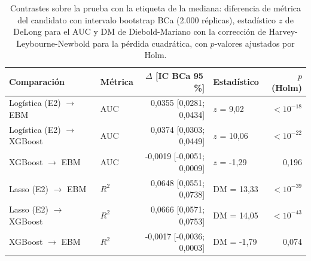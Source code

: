 \begin{table}[htbp]
\caption{Contrastes sobre la prueba con la etiqueta de la mediana: diferencia de métrica del candidato con intervalo bootstrap BCa (2.000 réplicas), estadístico $z$ de DeLong para el AUC y DM de Diebold-Mariano con la corrección de Harvey-Leybourne-Newbold para la pérdida cuadrática, con $p$-valores ajustados por Holm.}\label{tab:contrastes}
\scriptsize\setlength{\tabcolsep}{2pt}
\begin{tabular}{llrlr}
\toprule
\textbf{Comparación} & \textbf{Métrica} & \textbf{$\Delta$ [IC BCa 95\,\%]} & \textbf{Estadístico} & \textbf{$p$ (Holm)} \\
\midrule
Logística (E2) $\rightarrow$ EBM & AUC & 0,0355 [0,0281; 0,0434] & $z$ = 9,02 & $<10^{-18}$ \\
Logística (E2) $\rightarrow$ XGBoost & AUC & 0,0374 [0,0303; 0,0449] & $z$ = 10,06 & $<10^{-22}$ \\
XGBoost $\rightarrow$ EBM & AUC & -0,0019 [-0,0051; 0,0009] & $z$ = -1,29 & 0,196 \\
Lasso (E2) $\rightarrow$ EBM & $R^2$ & 0,0648 [0,0551; 0,0738] & DM = 13,33 & $<10^{-39}$ \\
Lasso (E2) $\rightarrow$ XGBoost & $R^2$ & 0,0666 [0,0571; 0,0753] & DM = 14,05 & $<10^{-43}$ \\
XGBoost $\rightarrow$ EBM & $R^2$ & -0,0017 [-0,0036; 0,0003] & DM = -1,79 & 0,074 \\
\bottomrule
\end{tabular}
\end{table}
